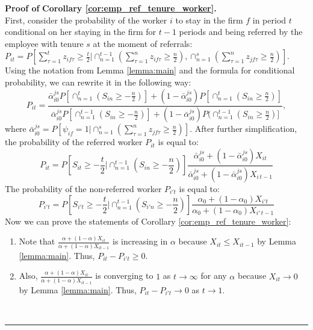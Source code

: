 \documentclass[12pt]{article}
\newenvironment{proof}[1][Proof of]{\noindent\textbf{#1} }{\ \rule{0.5em}{0.5em}}
\begin{document}
\begin{proof}
\textbf{Corollary \ref{cor:emp_ref_tenure_worker}.}\\
First, consider the probability of the worker $i$ to stay in the firm $f$ in period $t$ conditional on her staying in the firm for $t-1$ periods and being referred by the employee with tenure $s$ at the moment of referrals: $P_{it} = P[\sum_{\tau = 1}^{t} z_{if\tau}\geq \frac{t}{2} \vert \cap_{n=1}^{t-1} (\sum_{\tau = 1}^{n} z_{if\tau}\geq \frac{n}{2}),\cap_{n=1}^{s} (\sum_{\tau = 1}^{n} z_{jf\tau}\geq \frac{n}{2})]$. Using the notation from Lemma \ref{lemma:main} and the formula for conditional probability, we can rewrite it in the following way:
\begin{equation}
P_{it} = \frac{\bar{\alpha}_{i0}^{js} P[\cap_{n=1}^{t}(S_{in} \geq -\frac{n}{2})]+ (1-\bar{\alpha}_{i0}^{js}) P[\cap_{n=1}^{t}(S_{in} \geq \frac{n}{2})] }{\bar{\alpha}_{i0}^{js} P[\cap_{n=1}^{t-1}(S_{in} \geq -\frac{n}{2})]+ (1-\bar{\alpha}_{i0}^{js}) P(\cap_{n=1}^{t-1}(S_{in} \geq \frac{n}{2})]},
\end{equation}
where $\bar{\alpha}_{i0}^{js}= P[\psi_{if}=1 \vert \cap_{n=1}^{s} (\sum_{\tau = 1}^{n} z_{jf\tau}\geq \frac{n}{2})]$. After further simplification, the probability of the referred worker $P_{it}$ is equal to:
\begin{equation}\label{eq:cor_4_P_it}
P_{it} = P \left[ S_{it} \geq -\frac{t}{2} \vert \cap_{n=1}^{t-1}(S_{in} \geq -\frac{n}{2})\right]
\frac{\bar{\alpha}_{i0}^{js}+(1-\bar{\alpha}_{i0}^{js})X_{it}}{\bar{\alpha}_{i0}^{js}+(1-\bar{\alpha}_{i0}^{js})X_{i\,t-1}}
\end{equation}
The probability of the non-referred worker $P_{i't}$ is equal to:
\begin{equation}\label{eq:cor_4_P_i't}
P_{i't} = P \left[ S_{i't} \geq -\frac{t}{2} \vert \cap_{n=1}^{t-1}(S_{i'n} \geq -\frac{n}{2})\right]
\frac{\alpha_0+(1-\alpha_0)X_{i't}}{\alpha_0+(1-\alpha_0)X_{i'\,t-1}}
\end{equation}
Now we can prove the statements of Corollary \ref{cor:emp_ref_tenure_worker}:
\begin{enumerate}[label={\roman*})]
\item Note that $\frac{\alpha+(1-\alpha)X_{it}}{\alpha+(1-\alpha)X_{it-1}}$ is increasing in $\alpha$ because $X_{it}\leq X_{it-1}$ by Lemma \ref{lemma:main}. Thus, $P_{it}-P_{i't}\geq 0$.
\item Also, $\frac{\alpha+(1-\alpha)X_{it}}{\alpha+(1-\alpha)X_{it-1}}$ is converging to $1$ as $t\rightarrow \infty$ for any $\alpha$ because $X_{it} \rightarrow 0$ by Lemma \ref{lemma:main}. Thus, $P_{it}-P_{i't} \rightarrow 0$  as $t \rightarrow 1$. 

\end{enumerate}
\end{proof}
\end{document}
